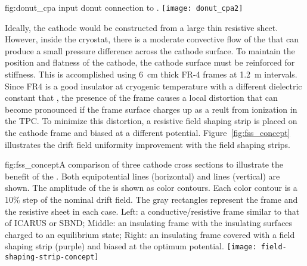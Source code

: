 \begin{dunefigure}{fig:donut_cpa}{ input donut connection to .}
\texttt{[image: donut\_cpa2]} %
\end{dunefigure}

Ideally, the cathode would be constructed from a large thin resistive sheet.  However, inside the cryostat, there is a moderate convective flow of the \lar that can produce a small pressure difference across the cathode surface.  To maintain the position and flatness of the cathode, the cathode surface must be reinforced for stiffness.  This is accomplished using \SI{6}{cm} thick FR-4 frames at \SI{1.2}{m} intervals. Since FR4 is a good insulator at cryogenic temperature with a different dielectric constant that \lar, the presence of the frame causes a local \efield distortion that can become pronounced if the frame surface charges up as a reult from ionization in the TPC.  To minimize this distortion, a resistive field shaping strip is placed on the cathode frame and biased at a different potential.  Figure~\ref{fig:fss_concept} illustrates the drift field uniformity improvement with the field shaping strips.

\begin{dunefigure}{fig:fss_concept}{A comparison of three cathode cross sections to illustrate the benefit of the . Both equipotential lines (horizontal) and \efield{} lines (vertical) are shown.  The amplitude of the \efield{} is shown as color contours. Each color contour is a 10\% step of the nominal drift field.  The gray rectangles represent the frame and the resistive sheet in each case. Left: a conductive/resistive frame similar to that of ICARUS or SBND; Middle: an insulating frame with the insulating surfaces charged to an equilibrium state; Right: an insulating frame covered with a field shaping strip (purple) and biased at the optimum potential. }
\texttt{[image: field-shaping-strip-concept]} %
\end{dunefigure}

